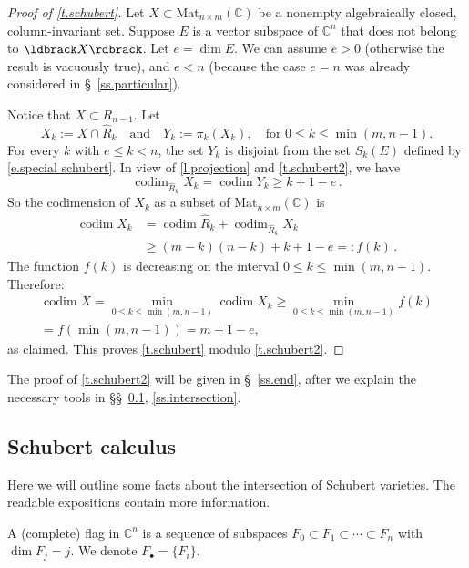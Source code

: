 \documentclass[10pt, a4paper]{amsart}
\theoremstyle{plain}
\theoremstyle{definition}
\theoremstyle{remark}
\theoremstyle{note}
\numberwithin{equation}{section}
\begin{document}
\begin{proof}[Proof of \cref{t.schubert}]
Let $X \subset {\mathrm{Mat}}_{n \times m}({\mathbb{C}})$ be a nonempty algebraically closed, column-invariant set.
Suppose $E$ is a vector subspace of ${\mathbb{C}}^n$ that does not belong to $\ldbrack X \rdbrack$.
Let $e = \dim E$.
We can assume $e > 0$ (otherwise the result is vacuously true), 
and $e<n$ (because the case $e=n$ was already considered in \S~\ref{ss.particular}).

Notice that $X \subset R_{n-1}$.
Let 
$$
X_k := X \cap \hat{R}_k \quad \text{and} \quad 
Y_k := \pi_k(X_k) , \quad \text{for } 0 \le k \le \min(m,n-1).
$$
For every $k$ with $e \le k < n$, the set $Y_k$ is disjoint from 
the set $S_k(E)$ defined by \eqref{e.special schubert}.
In view of \cref{l.projection} and \cref{t.schubert2}, we have
$$
\operatorname{codim}_{\hat{R}_k} X_k =  \operatorname{codim} Y_k \ge k + 1 - e \, .
$$
So the codimension of $X_k$ as a subset of ${\mathrm{Mat}}_{n\times m}({\mathbb{C}})$ is
\begin{align*}
\operatorname{codim} X_k &=   \operatorname{codim} \hat{R}_k + \operatorname{codim}_{\hat{R}_k} X_k \\
           &\ge (m-k)(n-k) + k + 1 - e =: f(k) \, .
\end{align*}
The function $f(k)$ is decreasing on the interval $0 \le k \le \min(m,n-1)$.
Therefore:
\begin{multline*}
\operatorname{codim} X 
=   \min_{0 \le k \le \min(m,n-1)} \operatorname{codim} X_k  
\ge \min_{0 \le k \le \min(m,n-1)} f(k) \\
= f(\min(m,n-1)) 
= m + 1 - e,
\end{multline*}
as claimed.
This proves \cref{t.schubert} modulo \cref{t.schubert2}.
\end{proof}

The proof of \cref{t.schubert2} will be given in \S~\ref{ss.end},
after we explain the necessary tools in \S\S~\ref{ss.schubert}, \ref{ss.intersection}.

\subsection{Schubert calculus} \label{ss.schubert}

Here we will outline some facts about the intersection of Schubert varieties.
The readable expositions \cite{Blasiak,Vakil} contain more information.

\medskip

A (complete) flag 
in ${\mathbb{C}}^{n}$ is a sequence of subspaces $F_0 \subset F_1 \subset \cdots \subset F_{n}$
with $\dim F_j = j$. We denote $F_\bullet = \{F_i\}$.
\end{document}
